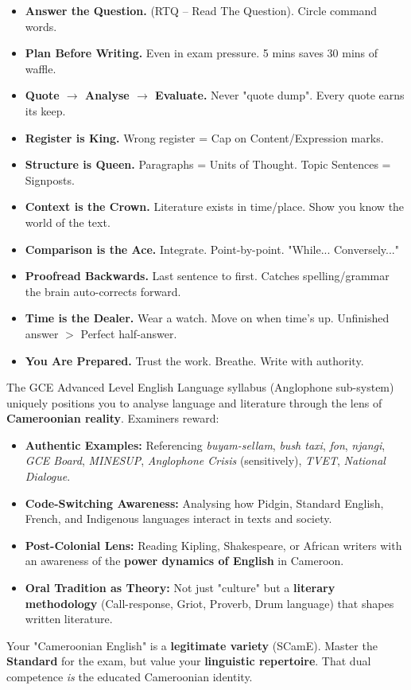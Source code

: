 \documentclass[11pt]{article}
\begin{document}
\begin{aretenir}
\begin{itemize}
    \item \textbf{Answer the Question.} (RTQ -- Read The Question). Circle command words.
    \item \textbf{Plan Before Writing.} Even in exam pressure. 5 mins saves 30 mins of waffle.
    \item \textbf{Quote $\rightarrow$ Analyse $\rightarrow$ Evaluate.} Never "quote dump". Every quote earns its keep.
    \item \textbf{Register is King.} Wrong register = Cap on Content/Expression marks.
    \item \textbf{Structure is Queen.} Paragraphs = Units of Thought. Topic Sentences = Signposts.
    \item \textbf{Context is the Crown.} Literature exists in time/place. Show you know the world of the text.
    \item \textbf{Comparison is the Ace.} Integrate. Point-by-point. "While... Conversely..."
    \item \textbf{Proofread Backwards.} Last sentence to first. Catches spelling/grammar the brain auto-corrects forward.
    \item \textbf{Time is the Dealer.} Wear a watch. Move on when time's up. Unfinished answer $>$ Perfect half-answer.
    \item \textbf{You Are Prepared.} Trust the work. Breathe. Write with authority.
\end{itemize}
\end{aretenir}

\begin{savaistu}
The GCE Advanced Level English Language syllabus (Anglophone sub-system) uniquely positions you to analyse language and literature through the lens of \textbf{Cameroonian reality}. Examiners reward:
\begin{itemize}
    \item \textbf{Authentic Examples:} Referencing \textit{buyam-sellam}, \textit{bush taxi}, \textit{fon}, \textit{njangi}, \textit{GCE Board}, \textit{MINESUP}, \textit{Anglophone Crisis} (sensitively), \textit{TVET}, \textit{National Dialogue}.
    \item \textbf{Code-Switching Awareness:} Analysing how Pidgin, Standard English, French, and Indigenous languages interact in texts and society.
    \item \textbf{Post-Colonial Lens:} Reading Kipling, Shakespeare, or African writers with an awareness of the \textbf{power dynamics of English} in Cameroon.
    \item \textbf{Oral Tradition as Theory:} Not just "culture" but a \textbf{literary methodology} (Call-response, Griot, Proverb, Drum language) that shapes written literature.
\end{itemize}
Your "Cameroonian English" is a \textbf{legitimate variety} (SCamE). Master the \textbf{Standard} for the exam, but value your \textbf{linguistic repertoire}. That dual competence \emph{is} the educated Cameroonian identity.
\end{savaistu}
\end{document}
